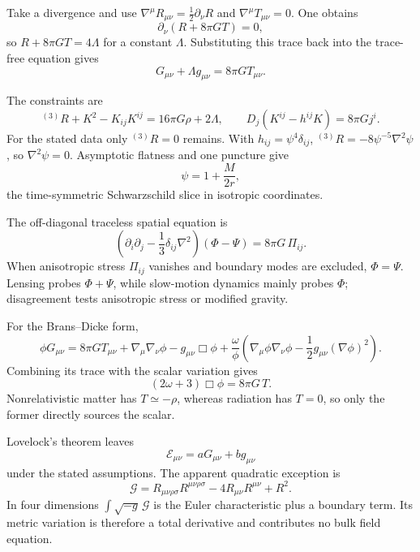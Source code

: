 \begin{solution}
Take a divergence and use
\(\nabla^\mu R_{\mu\nu}=\tfrac12\partial_\nu R\) and
\(\nabla^\mu T_{\mu\nu}=0\).  One obtains
\[
\partial_\nu(R+8\pi GT)=0,
\]
so \(R+8\pi GT=4\Lambda\) for a constant \(\Lambda\).  Substituting this trace
back into the trace-free equation gives
\[
G_{\mu\nu}+\Lambda g_{\mu\nu}=8\pi GT_{\mu\nu}.
\]
\end{solution}

\begin{solution}
The constraints are
\[
{}^{(3)}R+K^2-K_{ij}K^{ij}=16\pi G\rho+2\Lambda,\qquad
D_j(K^{ij}-h^{ij}K)=8\pi Gj^i.
\]
For the stated data only \({}^{(3)}R=0\) remains.  With
\(h_{ij}=\psi^4\delta_{ij}\),
\({}^{(3)}R=-8\psi^{-5}\nabla^2\psi\), so \(\nabla^2\psi=0\).
Asymptotic flatness and one puncture give
\[
\psi=1+\frac{M}{2r},
\]
the time-symmetric Schwarzschild slice in isotropic coordinates.
\end{solution}

\begin{solution}
The off-diagonal traceless spatial equation is
\[
\left(\partial_i\partial_j-\frac13\delta_{ij}\nabla^2\right)
(\Phi-\Psi)=8\pi G\,\Pi_{ij}.
\]
When anisotropic stress \(\Pi_{ij}\) vanishes and boundary modes are excluded,
\(\Phi=\Psi\).  Lensing probes \(\Phi+\Psi\), while slow-motion dynamics
mainly probes \(\Phi\); disagreement tests anisotropic stress or modified
gravity.
\end{solution}

\begin{solution}
For the Brans--Dicke form,
\[
\phi G_{\mu\nu}
=8\pi GT_{\mu\nu}
+\nabla_\mu\nabla_\nu\phi-g_{\mu\nu}\Box\phi
+\frac{\omega}{\phi}
\left(\nabla_\mu\phi\nabla_\nu\phi
-\frac12g_{\mu\nu}(\nabla\phi)^2\right).
\]
Combining its trace with the scalar variation gives
\[
(2\omega+3)\Box\phi=8\pi G\,T.
\]
Nonrelativistic matter has \(T\simeq-\rho\), whereas radiation has
\(T=0\), so only the former directly sources the scalar.
\end{solution}

\begin{solution}
Lovelock's theorem leaves
\[
\mathcal E_{\mu\nu}=aG_{\mu\nu}+b g_{\mu\nu}
\]
under the stated assumptions.  The apparent quadratic exception is
\[
\mathcal G=R_{\mu\nu\rho\sigma}R^{\mu\nu\rho\sigma}
-4R_{\mu\nu}R^{\mu\nu}+R^2.
\]
In four dimensions \(\int\sqrt{-g}\,\mathcal G\) is the Euler characteristic
plus a boundary term.  Its metric variation is therefore a total derivative
and contributes no bulk field equation.
\end{solution}
